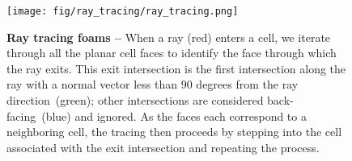 \begin{figure}
\centering
\texttt{[image: fig/ray\_tracing/ray\_tracing.png]}
% 
\caption{
    {\bf Ray tracing foams -- }
    When a ray {\color{figred}(red)} enters a cell, we iterate through all the planar cell faces to identify the face through which the ray exits.
    This exit intersection is the first intersection along the ray with a normal vector less than 90 degrees from the ray direction~{\color{figgreen}(green)}; other intersections are considered back-facing~{\color{figblue}(blue)} and ignored.
    As the faces each correspond to a neighboring cell, the tracing then proceeds by stepping into the cell associated with the exit intersection and repeating the process.
}
\label{fig:ray_tracing}
\end{figure}